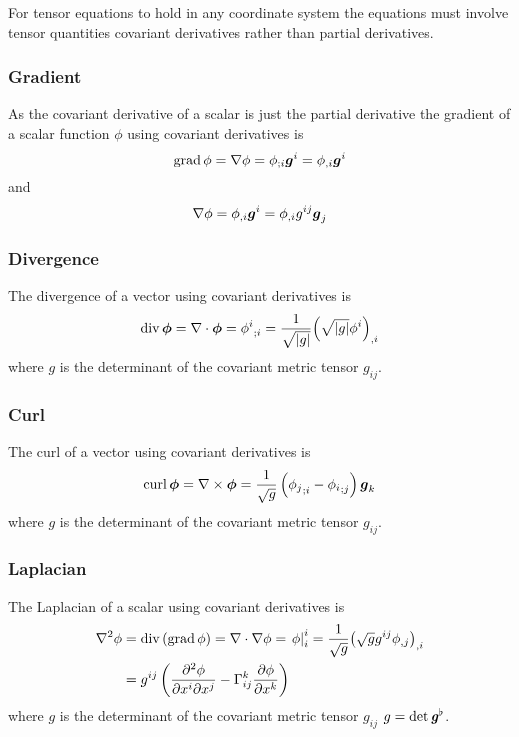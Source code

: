 For tensor equations to hold in any coordinate system the equations must
involve tensor quantities \ie covariant derivatives rather than partial derivatives.

\subsubsection{Gradient}

As the covariant derivative of a scalar is just the partial derivative the
gradient of a scalar function $\phi$ using covariant derivatives is
\begin{equation}
  \gradop \phi = \gradient{}{\phi}=\covarderiv{\phi}{i}\vectr{g}^{i}=\partialderiv{\phi}{i}\vectr{g}^{i}
\end{equation}
and
\begin{equation}
  \gradient{}{\phi}=\partialderiv{\phi}{i}\vectr{g}^{i}=\partialderiv{\phi}{i}g^{ij}\vectr{g}_{j}
\end{equation}

\subsubsection{Divergence}

The divergence of a vector using covariant derivatives is
\begin{equation}
  \divop \vectr{\phi} = \divergence{}{\vectr{\phi}}=\covarderiv{\phi^{i}}{i}=\frac{1}{\sqrt{\abs{g}}}\partialderiv{\pbrac{\sqrt{\abs{g}}\phi^{i}}}{i}
\end{equation}
where $g$ is the determinant of the covariant metric tensor $g_{ij}$.

\subsubsection{Curl}

The curl of a vector using covariant derivatives is
\begin{equation}
  \curlop \vectr{\phi} = \curl{}{\vectr{\phi}}=\frac{1}{\sqrt{g}}\pbrac{\covarderiv{\phi_{j}}{i}-\covarderiv{\phi_{i}}{j}}\vectr{g}_{k}
\end{equation}
where $g$ is the determinant of the covariant metric tensor $g_{ij}$.

\subsubsection{Laplacian}

The Laplacian of a scalar using covariant derivatives is
\begin{equation}
  \begin{aligned}
    \laplacian{}{\phi}&=\divop\pbrac{\gradop\phi}=\divergence{}{\gradient{}{\phi}}=\mixedderiv{\phi}{i}{i}=\frac{1}{\sqrt{g}}\partialderiv{\pbrac{\sqrt{g}g^{ij}\partialderiv{\phi}{j}}}{i}\\
    &=g^{ij}\pbrac{\deltwoby{\phi}{x^{i}}{x^{j}}-\christoffel{k}{i}{j}\delby{\phi}{x^{k}}}
  \end{aligned}
\end{equation}
where $g$ is the determinant of the covariant metric tensor $g_{ij}$ \ie $g=\det \boldsymbol{\mathit{g}}^{\flat}$.

